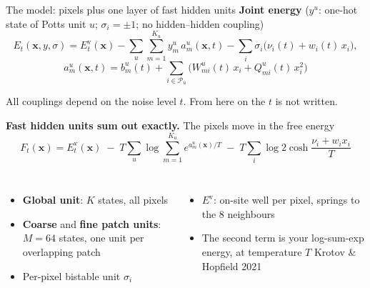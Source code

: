 \documentclass[aspectratio=169,10pt]{beamer}
\newcommand{\x}{\bm{x}}
\newcommand{\src}[1]{{\color{muted}\scriptsize #1}}
\begin{document}
\begin{frame}{The model: pixels plus one layer of fast hidden units}
  \textbf{Joint energy} ($y^{u}$: one-hot state of Potts unit $u$; $\sigma_i=\pm1$; no hidden--hidden coupling)
  {\small
  \[
    E_t(\x,y,\sigma)=E^{\mathrm v}_t(\x)-\sum_u\sum_{m=1}^{K_u} y^{u}_{m}\,a^{u}_{m}(\x,t)-\sum_i\sigma_i\bigl(\nu_i(t)+w_i(t)\,x_i\bigr),
  \]
  \vspace{-0.3cm}
  \[
    a^{u}_{m}(\x,t)=b^{u}_{m}(t)+\!\sum_{i\in\mathcal P_u}\!\bigl(W^{u}_{mi}(t)\,x_i+Q^{u}_{mi}(t)\,x_i^{2}\bigr)
  \]}
  \vspace{-0.05cm}

  {\footnotesize\color{muted} All couplings depend on the noise level $t$. From here on the $t$ is not written.}
  \vspace{0.05cm}


  \textbf{Fast hidden units sum out exactly.} The pixels move in the free energy
  \[
    F_t(\x)=E^{\mathrm v}_t(\x)
      \;-\;T\sum_u\log\sum_{m=1}^{K_u}e^{a^{u}_{m}(\x)/T}
      \;-\;T\sum_i\log2\cosh\frac{\nu_i+w_ix_i}{T}
  \]
  \vspace{-0.2cm}
  \begin{columns}[T,onlytextwidth]
    \small
      \begin{itemize}
        \item {\color{globalcol}\bfseries Global unit}: $K$ states, all pixels
        \item {\color{coarsecol}\bfseries Coarse} and {\color{finecol}\bfseries fine patch units}:
          $M=64$ states, one unit per overlapping patch
        \item Per-pixel bistable unit $\sigma_i$
      \end{itemize}
    \small
      \begin{itemize}
        \item $E^{\mathrm v}$: on-site well per pixel, springs to the 8 neighbours
        \item The second term is your log-sum-exp energy, at temperature $T$
          \src{Krotov \& Hopfield 2021}
      \end{itemize}
  \end{columns}
\end{frame}
\end{document}
